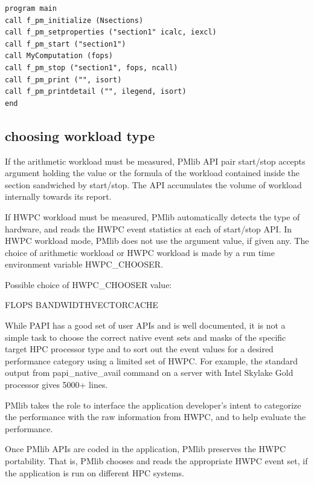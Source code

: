 \documentclass[conference]{IEEEtran}
\begin{document}
\begin{lstlisting}[caption={using PMlib in Fortran program}]
program main
call f_pm_initialize (Nsections)
call f_pm_setproperties ("section1" icalc, iexcl)
call f_pm_start ("section1")
call MyComputation (fops)
call f_pm_stop ("section1", fops, ncall)
call f_pm_print ("", isort)
call f_pm_printdetail ("", ilegend, isort)
end
\end{lstlisting}


\subsection {choosing workload type}
If the arithmetic workload must be measured,
PMlib API pair start/stop accepts argument holding the value or the formula
of the workload contained inside the section sandwiched by start/stop.
The API accumulates the volume of workload internally towards its report.

If HWPC workload must be measured,
PMlib automatically detects the type of hardware, and reads the HWPC
event statistics at each of start/stop API.
In HWPC workload mode, PMlib does not use the argument value, if given any.
The choice of arithmetic workload or HWPC workload is made by a
run time environment variable HWPC\_CHOOSER.

Possible choice of HWPC\_CHOOSER value:

FLOPS \textbar BANDWIDTH\textbar VECTOR\textbar CACHE

While PAPI has a good set of user APIs and is well documented,
it is not a simple task to choose the correct native event sets and masks
of the specific target HPC processor type and to sort out the event values for
a desired performance category using a limited set of HWPC.
For example,
the standard output from papi\_native\_avail command on a server with
Intel Skylake Gold processor gives 5000+ lines.

PMlib takes the role to interface the application developer's intent to
categorize the performance with the raw information from HWPC, and to
help evaluate the performance.


Once PMlib APIs are coded in the application, PMlib preserves the HWPC
portability. That is, PMlib chooses and reads the appropriate HWPC event
set, if the application is run on different HPC systems.


\end{document}
